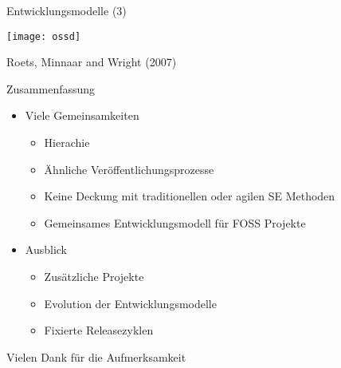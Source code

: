 \documentclass[11pt]{beamer}
\begin{document}
\begin{frame}{Entwicklungsmodelle (3)}
  \begin{center}
    \texttt{[image: ossd]}

    {\tiny\hfill
    Roets, Minnaar and Wright (2007)
    }
  \end{center}
\end{frame}


\begin{frame}{Zusammenfassung}
  \begin{itemize}
    \item Viele Gemeinsamkeiten
    \begin{itemize}
    \item Hierachie
    \item Ähnliche Veröffentlichungsprozesse
    \item Keine Deckung mit traditionellen oder agilen SE Methoden
    \item Gemeinsames Entwicklungsmodell für FOSS Projekte
    \end{itemize}
    \item Ausblick
    \begin{itemize}
      \item Zusätzliche Projekte
      \item Evolution der Entwicklungsmodelle
      \item Fixierte Releasezyklen
    \end{itemize}
  \end{itemize}
\end{frame}

\begin{frame}
  \begin{center}
  {\Large Vielen Dank für die Aufmerksamkeit}
  \end{center}
\end{frame}
\end{document}
